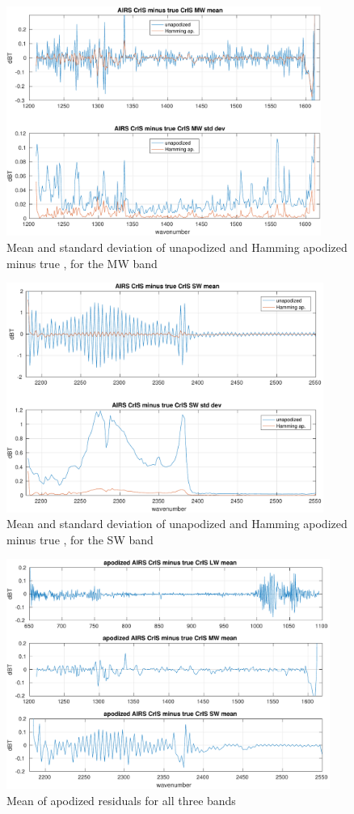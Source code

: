 \documentclass[11pt]{article}
\begin{document}
\begin{figure} %
  \centering
  \includegraphics[height=7.5cm]{figures/a2cris_diff_MW.pdf}
  \caption{Mean and standard deviation of unapodized and Hamming
    apodized {\airs} {\cris} minus true {\cris}, for the {\cris} MW
    band}
  \label{diffMW}
\end{figure}

\begin{figure} %
  \centering
  \includegraphics[height=7.5cm]{figures/a2cris_diff_SW.pdf}
  \caption{Mean and standard deviation of unapodized and Hamming
    apodized {\airs} {\cris} minus true {\cris}, for the {\cris} SW
    band}
  \label{diffSW}
\end{figure}

\begin{figure} %
  \centering
  \includegraphics[height=7.5cm]{figures/combo_ap_dif_mean.pdf}
  \caption{Mean of apodized residuals for all three {\cris} bands}
  \label{meanAll}
\end{figure}
\end{document}
